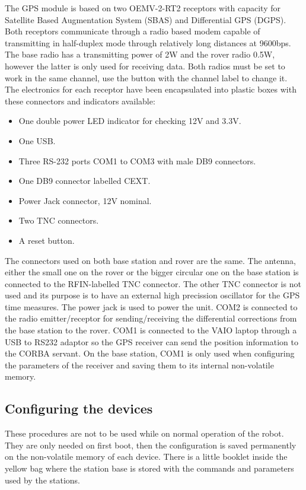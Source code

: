 The GPS module is based on two OEMV-2-RT2 receptors with capacity for Satellite Based
Augmentation System (SBAS) and Differential GPS (DGPS). Both receptors
communicate through a radio based modem capable of transmitting in half-duplex
mode through relatively long distances at 9600bps. The base radio has a transmitting power of 2W and the
rover radio 0.5W, however the latter is only used for receiving data. Both radios must be set to work in the same channel, use the button with the channel label to change it.
The electronics for each receptor have been encapsulated into plastic boxes with
these connectors and indicators available:
\begin{itemize}
  \item One double power LED indicator for checking 12V and 3.3V.
  \item One USB.
  \item Three RS-232 ports COM1 to COM3 with male DB9 connectors.
  \item One DB9 connector labelled CEXT.
  \item Power Jack connector, 12V nominal.
  \item Two TNC connectors.
  \item A reset button.
\end{itemize}
The connectors used on both base station and rover are the same. The antenna,
either the small one on the rover or the bigger circular one on the base station
is connected to the RFIN-labelled TNC connector. The other TNC connector is not
used and its purpose is to have an external high precission oscillator for the
GPS time measures. The power jack is used to power the unit. COM2 is connected
to the radio emitter/receptor for sending/receiving the differential corrections
from the base station to the rover. COM1 is connected to the VAIO laptop through
a USB to RS232 adaptor so the GPS receiver can send the position information to
the CORBA servant. On the base station, COM1 is only used when configuring the
parameters of the receiver and saving them to its internal non-volatile memory.


\subsection{Configuring the devices}
These procedures are not to be used while on normal operation of the robot. They
are only needed on first boot, then the configuration is saved permanently on
the non-volatile memory of each device. There is a little booklet inside the yellow bag where the station base is stored with the commands and parameters used by the stations.


